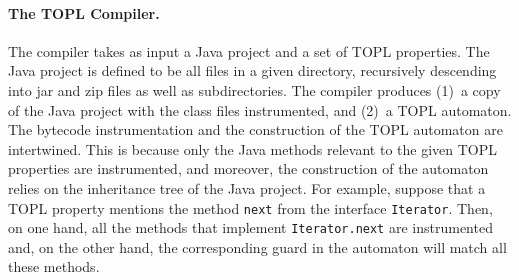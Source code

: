 \documentclass[9pt, preprint]{sigplanconf} %
\theoremstyle{definition}
\theoremstyle{remark}
\begin{document}
\paragraph{The TOPL Compiler.} \label{sec:toplc} %
The compiler takes as input a Java project and a set of TOPL properties.
The Java project is defined to be all files in a given directory, recursively descending into jar and zip files as well as  subdirectories.
The compiler produces (1)~a copy of the Java project with the class files instrumented, and (2)~a TOPL automaton.
The bytecode instrumentation and the construction of the TOPL automaton are intertwined.
This is because only the Java methods relevant to the given TOPL properties are instrumented, and moreover,
 the construction of the  automaton relies on the inheritance tree of the Java project.
For example, suppose that a TOPL property mentions the method {\tt next} from the interface {\tt Iterator}.
Then, on one hand, all the methods that implement {\tt Iterator.next} are instrumented and, on the other hand, the corresponding guard in the automaton will match all these methods.
\end{document}
